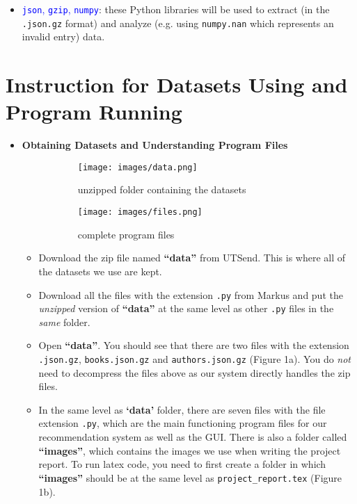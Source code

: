 \documentclass[fontsize=11pt]{article}
\begin{document}
\begin{itemize}
\begin{itemize}
    \item \textcolor{blue}{\texttt{json}, \texttt{gzip}, \texttt{numpy}}: these Python libraries will be used to extract (in the \texttt{.json.gz} format) and analyze (e.g. using \texttt{numpy.nan} which represents an invalid entry) data.
\end{itemize}
\end{itemize}

\section*{Instruction for Datasets Using and Program Running}
\begin{itemize}
    \item \textbf{Obtaining Datasets and Understanding Program Files}
    \begin{figure}[h!]
	\centering
        \begin{subfigure}[b]{0.3\textwidth}
    	\texttt{[image: images/data.png]}
            \caption{unzipped folder containing the datasets}
        \end{subfigure}
        \begin{subfigure}[b]{0.3\textwidth}
            \texttt{[image: images/files.png]}
            \caption{complete program files}
        \end{subfigure}
        \caption{}
        \label{fig:folder}
    \end{figure}
    \begin{itemize}
        \item Download the zip file named \textbf{``data''} from UTSend. This is where all of the datasets we use are kept.
        \item Download all the files with the extension \texttt{.py} from Markus and put the \textit{unzipped} version of \textbf{``data''} at the same level as other \texttt{.py} files in the \textit{same} folder.
        \item Open \textbf{``data''}. You should see that there are two files with the extension \texttt{.json.gz}, \texttt{books.json.gz} and \texttt{authors.json.gz} (Figure 1a). You do \textit{not} need to decompress the files above as our system directly handles the zip files.
        \item In the same level as \textbf{`data'} folder, there are seven files with the file extension \texttt{.py}, which are the main functioning program files for our recommendation system as well as the GUI. There is also a folder called \textbf{``images''}, which contains the images we use when writing the project report. To run latex code, you need to first create a folder in which \textbf{``images''} should be at the same level as \texttt{project\_report.tex} (Figure 1b).
    \end{itemize}


\end{itemize}
\end{document}
